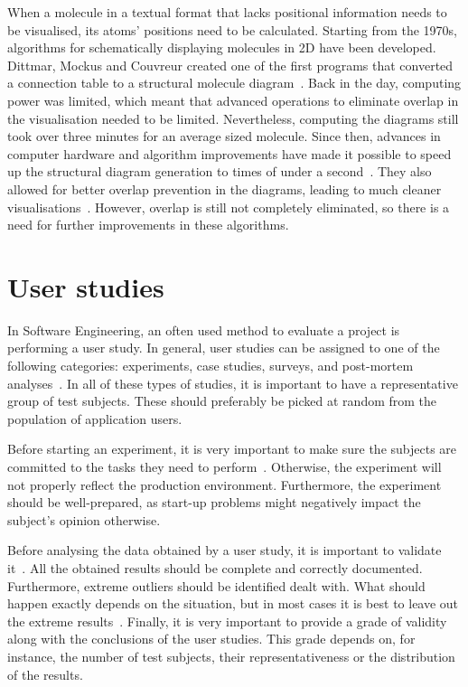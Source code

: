 When a molecule in a textual format that lacks positional information needs to be visualised, its atoms' positions need to be calculated. Starting from the 1970s, algorithms for schematically displaying molecules in 2D have been developed. Dittmar, Mockus and Couvreur created one of the first programs that converted a connection table to a structural molecule diagram~\cite{dittmar1977algorithmic}. Back in the day, computing power was limited, which meant that advanced operations to eliminate overlap in the visualisation needed to be limited. Nevertheless, computing the diagrams still took over three minutes for an average sized molecule. Since then, advances in computer hardware and algorithm improvements have made it possible to speed up the structural diagram generation to times of under a second~\cite{fricker2004automated}. They also allowed for better overlap prevention in the diagrams, leading to much cleaner visualisations~\cite{clark2006structure}. However, overlap is still not completely eliminated, so there is a need for further improvements in these algorithms.



\section{User studies}
In Software Engineering, an often used method to evaluate a project is performing a user study. In general, user studies can be assigned to one of the following categories: experiments, case studies, surveys, and post-mortem analyses~\cite{wohlin2003empirical}. In all of these types of studies, it is important to have a representative group of test subjects. These should preferably be picked at random from the population of application users.

Before starting an experiment, it is very important to make sure the subjects are committed to the tasks they need to perform~\cite{stein2009assessing}. Otherwise, the experiment will not properly reflect the production environment. Furthermore, the experiment should be well-prepared, as start-up problems might negatively impact the subject's opinion otherwise.

Before analysing the data obtained by a user study, it is important to validate it~\cite{wohlin2003empirical}. All the obtained results should be complete and correctly documented. Furthermore, extreme outliers should be identified dealt with. What should happen exactly depends on the situation, but in most cases it is best to leave out the extreme results~\cite{komarov2013crowdsourcing}. Finally, it is very important to provide a grade of validity along with the conclusions of the user studies. This grade depends on, for instance, the number of test subjects, their representativeness or the distribution of the results.
